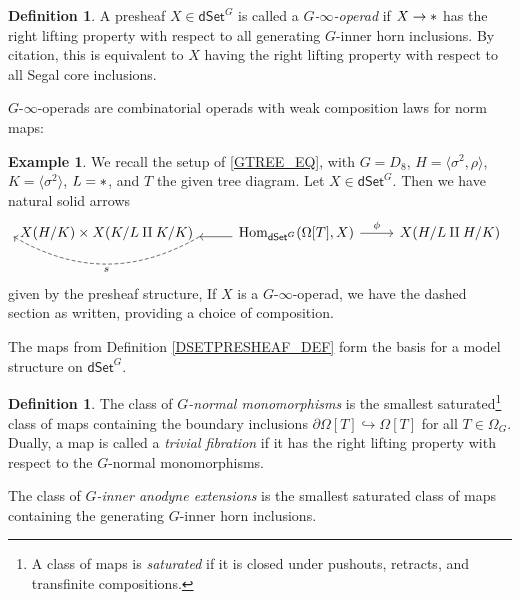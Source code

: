 \documentclass[a4paper,10pt
,draft
]{article}%
\numberwithin{equation}{section}
\numberwithin{figure}{section}
\theoremstyle{definition} %
\newtheorem{definition}[equation]{Definition}%
\newtheorem{example}[equation]{Example}%
\newcommand{\into}{\hookrightarrow}%
\newcommand{\dSet}{\mathsf{dSet}}
\DeclareMathOperator{\Hom}{Hom}%
\newcommand{\1}{\ensuremath{\mathbbm 1}}%
\begin{document}
\begin{definition}
      A presheaf $X \in \dSet^G$ is called a \textit{$G$-$\infty$-operad} if $X \to \**$ has the right lifting property with respect to all generating $G$-inner horn inclusions.
      By {\color{blue} citation}, this is equivalent to $X$ having the right lifting property with respect to all Segal core inclusions.
\end{definition}

$G$-$\infty$-operads are combinatorial operads with weak composition laws for norm maps:
\begin{example}
      We recall the setup of \eqref{GTREE_EQ}, with $G = D_8$, $H = \langle \sigma^2,\rho \rangle$, $K = \langle \sigma^2 \rangle$, $L = \**$, and $T$ the given tree diagram.
      Let $X \in \dSet^G$. Then we have natural solid arrows
      \[
            \begin{tikzcd}
                  X(H/K) \times X(K/L \amalg K/K) \arrow[start anchor = east, end anchor = west, dashed, bend left, shift left, "s"]
                  &
                  \Hom_{\dSet^G}(\Omega[T], X) \arrow[l, shift left] \arrow[r, "\phi"]
                  &
                  X(H/L \amalg H/K)
            \end{tikzcd}
      \]
      given by the presheaf structure,
      If $X$ is a $G$-$\infty$-operad, we have the dashed section as written,
      providing a choice of composition.     
\end{example}




The maps from Definition \ref{DSETPRESHEAF_DEF} form the basis for a model structure on $\dSet^G$.

\begin{definition}
      The class of \textit{$G$-normal monomorphisms}
      is the smallest saturated\footnote{A class of maps is \textit{saturated} if it is closed under pushouts, retracts, and transfinite compositions.}
      class of maps containing the boundary inclusions $\partial \Omega[T] \into \Omega[T]$ for all $T \in \Omega_G$.
      Dually, a map is called a \textit{trivial fibration} if it has the right lifting property with respect to the $G$-normal monomorphisms.
      
      The class of \textit{$G$-inner anodyne extensions} is the smallest saturated class of maps containing the generating $G$-inner horn inclusions.
\end{definition}
\end{document}
